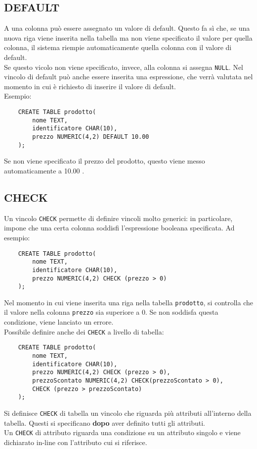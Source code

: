 \documentclass[12pt,a4paper]{book}
\begin{document}
	\subsection{DEFAULT} A una colonna può essere assegnato un valore di default. Questo fa sì che, se una nuova riga viene inserita nella tabella ma non viene specificato il valore per quella colonna, il sistema riempie automaticamente quella colonna con il valore di default.\\
	Se questo vicolo non viene specificato, invece, alla colonna si assegna \texttt{NULL}. Nel vincolo di default può anche essere inserita una espressione, che verrà valutata nel momento in cui è richiesto di inserire il valore di default.\\
	Esempio:
	\begin{lstlisting}
	CREATE TABLE prodotto(
		nome TEXT,
		identificatore CHAR(10),
		prezzo NUMERIC(4,2) DEFAULT 10.00
	);
	\end{lstlisting}
	Se non viene specificato il prezzo del prodotto, questo viene messo automaticamente a 10.00 .
	\subsection{CHECK}
	Un vincolo \texttt{CHECK} permette di definire vincoli molto generici: in particolare, impone che una certa colonna soddisfi l'espressione booleana specificata. Ad esempio:
	\begin{lstlisting}
	CREATE TABLE prodotto(
		nome TEXT,
		identificatore CHAR(10),
		prezzo NUMERIC(4,2) CHECK (prezzo > 0)
	);
	\end{lstlisting}
	Nel momento in cui viene inserita una riga nella tabella \texttt{prodotto}, si controlla che il valore nella colonna \texttt{prezzo} sia superiore a 0. Se non soddisfa questa condizione, viene lanciato un errore.\\
	Possibile definire anche dei \texttt{CHECK} a livello di tabella:
	\begin{lstlisting}
	CREATE TABLE prodotto(
		nome TEXT,
		identificatore CHAR(10),
		prezzo NUMERIC(4,2) CHECK (prezzo > 0),
		prezzoScontato NUMERIC(4,2) CHECK(prezzoScontato > 0),
		CHECK (prezzo > prezzoScontato)
	);
	\end{lstlisting}
	Si definisce \texttt{CHECK} di tabella un vincolo che riguarda più attributi all'interno della tabella. Questi si specificano \textbf{dopo} aver definito tutti gli attributi.\\
	Un \texttt{CHECK} di attributo riguarda una condizione su un attributo singolo e viene dichiarato in-line con l'attributo cui si riferisce.
\end{document}
